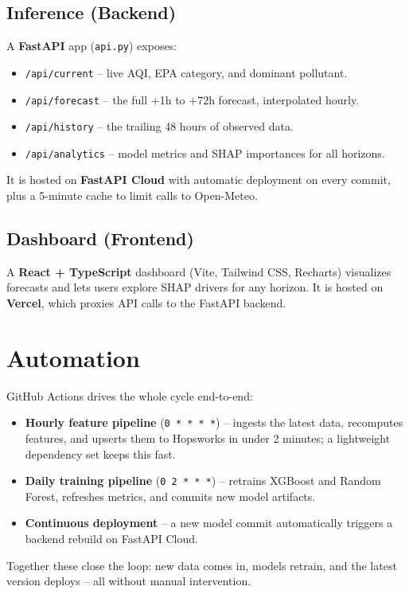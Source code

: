 \documentclass[12pt, a4paper]{article}
\begin{document}
\subsection{Inference (Backend)}
A \textbf{FastAPI} app (\texttt{api.py}) exposes:
\begin{itemize}
  \item \texttt{/api/current} -- live AQI, EPA category, and dominant pollutant.
  \item \texttt{/api/forecast} -- the full +1h to +72h forecast, interpolated hourly.
  \item \texttt{/api/history} -- the trailing 48 hours of observed data.
  \item \texttt{/api/analytics} -- model metrics and SHAP importances for all horizons.
\end{itemize}
It is hosted on \textbf{FastAPI Cloud} with automatic deployment on every commit, plus a 5-minute cache to limit calls to Open-Meteo.

\subsection{Dashboard (Frontend)}
A \textbf{React + TypeScript} dashboard (Vite, Tailwind CSS, Recharts) visualizes forecasts and lets users explore SHAP drivers for any horizon. It is hosted on \textbf{Vercel}, which proxies API calls to the FastAPI backend.


\section{Automation}

GitHub Actions drives the whole cycle end-to-end:
\begin{itemize}
  \item \textbf{Hourly feature pipeline} (\texttt{0\ *\ *\ *\ *}) -- ingests the latest data, recomputes features, and upserts them to Hopsworks in under 2 minutes; a lightweight dependency set keeps this fast.
  \item \textbf{Daily training pipeline} (\texttt{0\ 2\ *\ *\ *}) -- retrains XGBoost and Random Forest, refreshes metrics, and commits new model artifacts.
  \item \textbf{Continuous deployment} -- a new model commit automatically triggers a backend rebuild on FastAPI Cloud.
\end{itemize}
Together these close the loop: new data comes in, models retrain, and the latest version deploys -- all without manual intervention.
\end{document}
